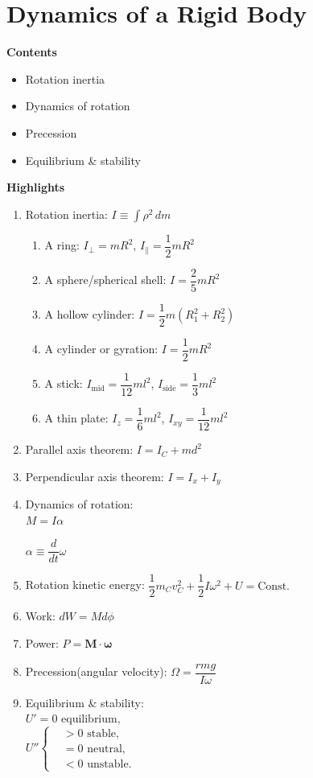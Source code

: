\documentclass[11pt, a4paper, oneside]{book}
\numberwithin{equation}{section}%
\begin{document}
\section{Dynamics of a Rigid Body}

\textbf{Contents}
	\begin{itemize}
	\item Rotation inertia
	\item Dynamics of rotation
	\item Precession
	\item Equilibrium \& stability
	\end{itemize}

\textbf{Highlights}
	\begin{enumerate}
		\item Rotation inertia: $\displaystyle{I \equiv \int\rho^2\,dm}$\\
			\begin{enumerate}
				\item A ring: $I_\perp = mR^2$, $I_\parallel = \dfrac{1}{2}mR^2$
				\item A sphere/spherical shell: $I = \dfrac{2}{5}mR^2$
				\item A hollow cylinder: $I = \dfrac{1}{2}m(R^2_1 + R^2_2)$
				\item A cylinder or gyration: $I = \dfrac{1}{2}mR^2$
				\item A stick: $I_{\text{mid}} = \dfrac{1}{12}ml^2$, $I_{\text{side}} = \dfrac{1}{3}ml^2$
				\item A thin plate: $I_{z} = \dfrac{1}{6}ml^2$, $I_{xy} = \dfrac{1}{12}ml^2$
			\end{enumerate}
		\item Parallel axis theorem: $I = I_C + md^2$
		\item Perpendicular axis theorem: $I = I_x + I_y$
		\item Dynamics of rotation:\\
			$M = I\alpha$
			
			$\alpha \equiv \dfrac{d}{dt}\omega$
		\item Rotation kinetic energy: 
			$\dfrac{1}{2}m_Cv_C^2 + \dfrac{1}{2}I\omega^2 + U = \text{Const.}$ 
		\item Work: 
			$dW = Md\phi$
		\item Power:
			$P = \bm{M}\cdot \bm{\omega}$
		\item Precession(angular velocity):
			$ \Omega = \dfrac{rmg}{I\omega} $
		\item Equilibrium \& stability:\\
			$ U' = 0 \text{ equilibrium,} $\\
			$ U'' \left\{\begin{aligned}
			&> 0 \text{ stable,} \\
			&= 0 \text{ neutral,} \\
			&< 0 \text{ unstable.}
			\end{aligned}\right.$
	\end{enumerate}
\end{document}
